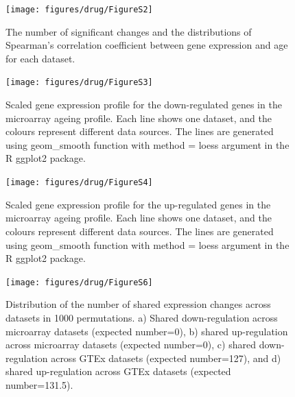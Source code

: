 \documentclass[12pt,twoside]{unicam}
\begin{document}
\begin{figure}

{\centering \texttt{[image: figures/drug/FigureS2]} 

}

\caption{The number of significant changes and the distributions of Spearman's correlation coefficient between gene expression and age for each dataset.}\label{fig:drugFigS2}
\end{figure}

\begin{figure}

{\centering \texttt{[image: figures/drug/FigureS3]} 

}

\caption[Gene expression profiles for the down-regulated genes in the ageing signature.]{Scaled gene expression profile for the down-regulated genes in the microarray ageing profile. Each line shows one dataset, and the colours represent different data sources. The lines are generated using geom\_smooth function with method = loess argument in the R ggplot2 package.}\label{fig:drugFigS3}
\end{figure}

\begin{figure}

{\centering \texttt{[image: figures/drug/FigureS4]} 

}

\caption[Gene expression profiles for the up-regulated genes in the ageing signature.]{Scaled gene expression profile for the up-regulated genes in the microarray ageing profile. Each line shows one dataset, and the colours represent different data sources. The lines are generated using geom\_smooth function with method = loess argument in the R ggplot2 package.}\label{fig:drugFigS4}
\end{figure}

\begin{figure}

{\centering \texttt{[image: figures/drug/FigureS6]} 

}

\caption[Distributions of the expected number of up- and down-regulated genes in the ageing signatures under null hypothesis.]{Distribution of the number of shared expression changes across datasets in 1000 permutations. a) Shared down-regulation across microarray datasets (expected number=0), b) shared up-regulation across microarray datasets (expected number=0), c) shared down-regulation across GTEx datasets (expected number=127), and d) shared up-regulation across GTEx datasets (expected number=131.5).}\label{fig:drugFigS6}
\end{figure}
\end{document}
